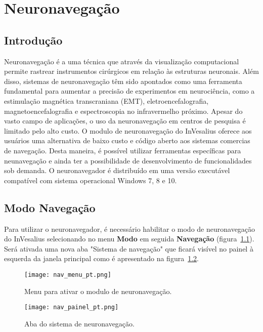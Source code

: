 \chapter{Neuronavegação}

\section{Introdução}

Neuronavegação é a uma técnica que através da visualização computacional permite rastrear instrumentos cirúrgicos em relação às estruturas neuronais. Além disso, sistemas de neuronavegação têm sido apontados como uma ferramenta fundamental para aumentar a precisão de experimentos em neurociência, como a estimulação magnética transcraniana (EMT), eletroencefalografia, magnetoencefalografia e espectroscopia no infravermelho próximo. Apesar do vasto campo de aplicações, o uso da neuronavegação em centros de pesquisa é limitado pelo alto custo. O modulo de neuronavegação do InVesalius oferece aos usuários uma alternativa de baixo custo e código aberto aos sistemas comercias de navegação. Desta maneira, é possível utilizar ferramentas específicas para neunavegação e ainda ter a possibilidade de desenvolvimento de funcionalidades sob demanda. O neuronavegador é distribuído em uma versão executável compatível com sistema operacional Windows 7, 8 e 10.

\section{Modo Navegação}

Para utilizar o neuronavegador, é necessário habilitar o modo de neuronavegação do InVesalius selecionando no menu \textbf{Modo} em seguida \textbf{Navegação} (figura~\ref{fig:nav_menu_pt}). Será ativada uma nova aba "Sistema de navegação" que ficará visível no painel à esquerda da janela principal como é apresentado na figura~\ref{fig:nav_painel_pt}.

\begin{figure}[!htb]
\centering
\texttt{[image: nav\_menu\_pt.png]}
\caption{Menu para ativar o modulo de neuronavegação.}
\label{fig:nav_menu_pt}
\end{figure}

\begin{figure}[!htb]
\centering
\texttt{[image: nav\_painel\_pt.png]}
\caption{Aba do sistema de neuronavegação.}
\label{fig:nav_painel_pt}
\end{figure}

